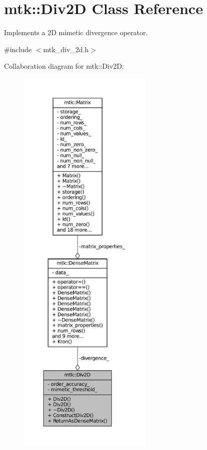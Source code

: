 \hypertarget{classmtk_1_1Div2D}{\section{mtk\+:\+:Div2\+D Class Reference}
\label{classmtk_1_1Div2D}
}


Implements a 2\+D mimetic divergence operator.  




{\ttfamily \#include $<$mtk\+\_\+div\+\_\+2d.\+h$>$}



Collaboration diagram for mtk\+:\+:Div2\+D\+:
\nopagebreak
\begin{figure}[H]
\begin{center}
\leavevmode
\includegraphics[height=550pt]{classmtk_1_1Div2D__coll__graph}
\end{center}
\end{figure}

